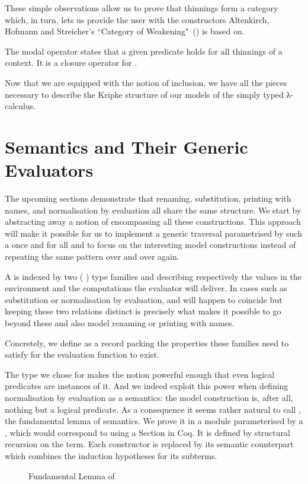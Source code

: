 These simple observations allow us to prove that thinnings
form a category which, in turn, lets us provide the user with the
constructors Altenkirch, Hofmann and Streicher's ``Category of
Weakening"~(\citeyear{altenkirch1995categorical}) is based on.

The modal operator  states that a given predicate holds for
all thinnings of a context. It is a closure operator for .


Now that we are equipped with the notion of inclusion, we have all
the pieces necessary to describe the Kripke structure of our models
of the simply typed λ-calculus.

\section{Semantics and Their Generic Evaluators}

The upcoming sections demonstrate that renaming, substitution, printing with names,
and normalisation by evaluation all share the same structure. We start by abstracting
away a notion of  encompassing all these constructions. This approach
will make it possible for us to implement a generic traversal parametrised by such
a  once and for all and to focus on the interesting model constructions
instead of repeating the same pattern over and over again.

A  is indexed by two ( ) type families
 and  describing respectively the values in the environment
and the computations the evaluator will deliver. In cases such as substitution
or normalisation by evaluation,  and  will happen to coincide but
keeping these two relations distinct is precisely what makes it possible to go
beyond these and also model renaming or printing with names.

Concretely, we define  as a record packing the properties these
families need to satisfy for the evaluation function to exist.


The type we chose for  makes the  notion
powerful enough that even logical predicates are instances of it. And we
indeed exploit this power when defining normalisation by evaluation
as a semantics: the model construction is, after all, nothing but a logical
predicate. As a consequence it seems rather natural to call , the
fundamental lemma of semantics. We prove it in a module parameterised by a
, which would correspond to using a Section in Coq. It is
defined by structural recursion on the term. Each constructor is replaced
by its semantic counterpart which combines the induction hypotheses
for its subterms.

\begin{figure}[h]
\caption{Fundamental Lemma of \label{fig:fundsem}}
\end{figure}
